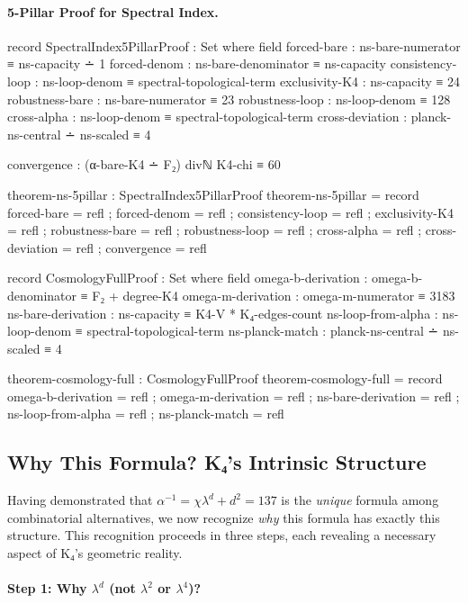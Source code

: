 \documentclass[11pt,a4paper]{book}
\begin{document}
\paragraph{5-Pillar Proof for Spectral Index.}

\begin{code}
record SpectralIndex5PillarProof : Set where
  field
    forced-bare : ns-bare-numerator ≡ ns-capacity ∸ 1
    forced-denom : ns-bare-denominator ≡ ns-capacity
    consistency-loop : ns-loop-denom ≡ spectral-topological-term
    exclusivity-K4 : ns-capacity ≡ 24
    robustness-bare : ns-bare-numerator ≡ 23
    robustness-loop : ns-loop-denom ≡ 128
    cross-alpha : ns-loop-denom ≡ spectral-topological-term
    cross-deviation : planck-ns-central ∸ ns-scaled ≡ 4
    
    convergence : (α-bare-K4 ∸ F₂) divℕ K4-chi ≡ 60

theorem-ns-5pillar : SpectralIndex5PillarProof
theorem-ns-5pillar = record
  { forced-bare = refl
  ; forced-denom = refl
  ; consistency-loop = refl
  ; exclusivity-K4 = refl
  ; robustness-bare = refl
  ; robustness-loop = refl
  ; cross-alpha = refl
  ; cross-deviation = refl
  ; convergence = refl
  }

record CosmologyFullProof : Set where
  field
    omega-b-derivation : omega-b-denominator ≡ F₂ + degree-K4
    omega-m-derivation : omega-m-numerator ≡ 3183
    ns-bare-derivation : ns-capacity ≡ K4-V * K₄-edges-count
    ns-loop-from-alpha : ns-loop-denom ≡ spectral-topological-term
    ns-planck-match    : planck-ns-central ∸ ns-scaled ≡ 4

theorem-cosmology-full : CosmologyFullProof
theorem-cosmology-full = record
  { omega-b-derivation = refl
  ; omega-m-derivation = refl
  ; ns-bare-derivation = refl
  ; ns-loop-from-alpha = refl
  ; ns-planck-match    = refl
  }
\end{code}

\subsection{Why This Formula? K₄'s Intrinsic Structure}
\label{sec:alpha-formula-why}

Having demonstrated that $\alpha^{-1} = \chi \lambda^d + d^2 = 137$ is the \emph{unique} 
formula among combinatorial alternatives, we now recognize \emph{why} this formula 
has exactly this structure. This recognition proceeds in three steps, each revealing 
a necessary aspect of K₄'s geometric reality.

\paragraph{Step 1: Why $\lambda^d$ (not $\lambda^2$ or $\lambda^4$)?}
\end{document}
